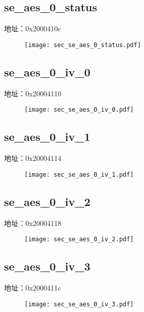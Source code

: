\subsection{se\_aes\_0\_status}
\label{sec-se-aes-0-status}
地址：0x2000410c
 \begin{figure}[H]
\texttt{[image: sec\_se\_aes\_0\_status.pdf]}
\end{figure}

\subsection{se\_aes\_0\_iv\_0}
\label{sec-se-aes-0-iv-0}
地址：0x20004110
 \begin{figure}[H]
\texttt{[image: sec\_se\_aes\_0\_iv\_0.pdf]}
\end{figure}

\subsection{se\_aes\_0\_iv\_1}
\label{sec-se-aes-0-iv-1}
地址：0x20004114
 \begin{figure}[H]
\texttt{[image: sec\_se\_aes\_0\_iv\_1.pdf]}
\end{figure}

\subsection{se\_aes\_0\_iv\_2}
\label{sec-se-aes-0-iv-2}
地址：0x20004118
 \begin{figure}[H]
\texttt{[image: sec\_se\_aes\_0\_iv\_2.pdf]}
\end{figure}

\subsection{se\_aes\_0\_iv\_3}
\label{sec-se-aes-0-iv-3}
地址：0x2000411c
 \begin{figure}[H]
\texttt{[image: sec\_se\_aes\_0\_iv\_3.pdf]}
\end{figure}

